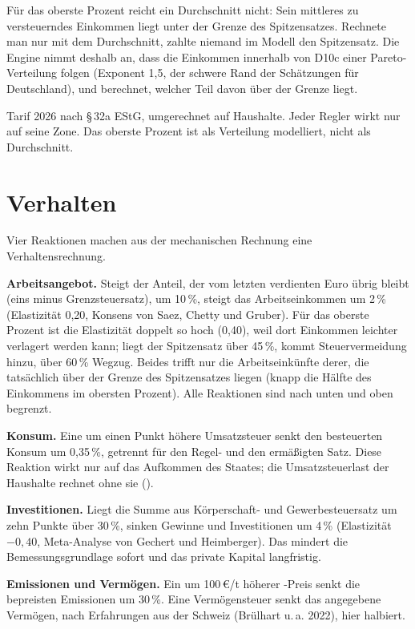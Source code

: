 Für das oberste Prozent reicht ein Durchschnitt nicht: Sein mittleres zu versteuerndes
Einkommen liegt unter der Grenze des Spitzensatzes. Rechnete man nur mit dem Durchschnitt,
zahlte niemand im Modell den Spitzensatz. Die Engine nimmt deshalb an, dass die Einkommen
innerhalb von D10c einer Pareto-Verteilung folgen (Exponent 1,5, der schwere Rand der
Schätzungen für Deutschland), und berechnet, welcher Teil davon über der Grenze liegt.

\begin{merksatz}
Tarif 2026 nach §\,32a EStG, umgerechnet auf Haushalte. Jeder Regler wirkt nur auf seine
Zone. Das oberste Prozent ist als Verteilung modelliert, nicht als Durchschnitt.
\end{merksatz}

\section{Verhalten}

Vier Reaktionen machen aus der mechanischen Rechnung eine Verhaltensrechnung.

\textbf{Arbeitsangebot.} Steigt der Anteil, der vom letzten verdienten Euro übrig bleibt
(eins minus Grenzsteuersatz), um 10\,\%, steigt das Arbeitseinkommen um 2\,\%
(Elastizität 0,20, Konsens von Saez, Chetty und Gruber). Für das oberste Prozent ist die
Elastizität doppelt so hoch (0,40), weil dort Einkommen leichter verlagert werden kann;
liegt der Spitzensatz über 45\,\%, kommt Steuervermeidung hinzu, über 60\,\% Wegzug. Beides
trifft nur die Arbeitseinkünfte derer, die tatsächlich über der Grenze des Spitzensatzes
liegen (knapp die Hälfte des Einkommens im obersten Prozent). Alle Reaktionen sind nach
unten und oben begrenzt.

\textbf{Konsum.} Eine um einen Punkt höhere Umsatzsteuer senkt den besteuerten Konsum um
0,35\,\%, getrennt für den Regel- und den ermäßigten Satz. Diese Reaktion wirkt nur auf das
Aufkommen des Staates; die Umsatzsteuerlast der Haushalte rechnet ohne sie
().

\textbf{Investitionen.} Liegt die Summe aus Körperschaft- und Gewerbesteuersatz um zehn Punkte
über 30\,\%, sinken Gewinne und Investitionen um 4\,\% (Elastizität $-0{,}40$, Meta-Analyse
von Gechert und Heimberger). Das mindert die Bemessungsgrundlage sofort und das private
Kapital langfristig.

\textbf{Emissionen und Vermögen.} Ein um 100\,\euro{}/t höherer \COz-Preis senkt die bepreisten
Emissionen um 30\,\%. Eine Vermögensteuer senkt das angegebene Vermögen, nach Erfahrungen aus
der Schweiz (Brülhart u.\,a. 2022), hier halbiert.

